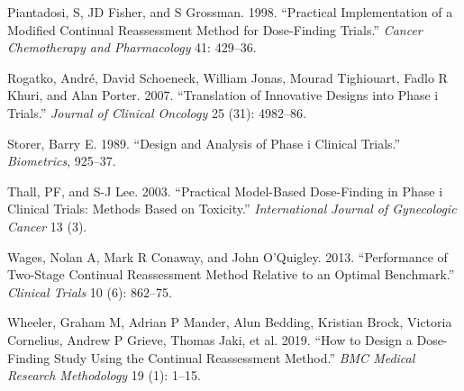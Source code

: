 \documentclass[
]{article}
\newlength{\cslhangindent}
\newlength{\cslentryspacingunit} %
\newenvironment{CSLReferences}[2] %
 {%
  \setlength{\parindent}{0pt}
  \ifodd #1
  \let\oldpar\par
  \def\par{\hangindent=\cslhangindent\oldpar}
  \fi
  \setlength{\parskip}{#2\cslentryspacingunit}
 }%
 {}
\begin{document}
\begin{CSLReferences}{1}{0}
\leavevmode{}%
Piantadosi, S, JD Fisher, and S Grossman. 1998. {``Practical
Implementation of a Modified Continual Reassessment Method for
Dose-Finding Trials.''} \emph{Cancer Chemotherapy and Pharmacology} 41:
429--36.

\leavevmode{}%
Rogatko, André, David Schoeneck, William Jonas, Mourad Tighiouart, Fadlo
R Khuri, and Alan Porter. 2007. {``Translation of Innovative Designs
into Phase i Trials.''} \emph{Journal of Clinical Oncology} 25 (31):
4982--86.

\leavevmode{}%
Storer, Barry E. 1989. {``Design and Analysis of Phase i Clinical
Trials.''} \emph{Biometrics}, 925--37.

\leavevmode{}%
Thall, PF, and S-J Lee. 2003. {``Practical Model-Based Dose-Finding in
Phase i Clinical Trials: Methods Based on Toxicity.''}
\emph{International Journal of Gynecologic Cancer} 13 (3).

\leavevmode{}%
Wages, Nolan A, Mark R Conaway, and John O'Quigley. 2013. {``Performance
of Two-Stage Continual Reassessment Method Relative to an Optimal
Benchmark.''} \emph{Clinical Trials} 10 (6): 862--75.

\leavevmode{}%
Wheeler, Graham M, Adrian P Mander, Alun Bedding, Kristian Brock,
Victoria Cornelius, Andrew P Grieve, Thomas Jaki, et al. 2019. {``How to
Design a Dose-Finding Study Using the Continual Reassessment Method.''}
\emph{BMC Medical Research Methodology} 19 (1): 1--15.

\end{CSLReferences}
\end{document}
